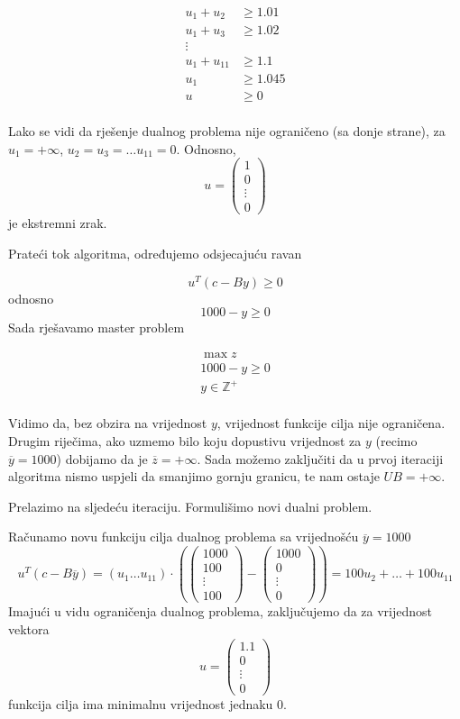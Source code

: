 \documentclass[a4paper, utf8, 11pt, colorlinks]{book}
\theoremstyle{definition}
\begin{document}
$$
\begin{aligned}
	u_1+u_2&\geqslant 1.01\\
	u_1+u_3&\geqslant 1.02\\
	\vdots&\\
	u_1+u_{11}&\geqslant 1.1\\
	u_1&\geqslant 1.045\\ 
	u&\geqslant 0\\
\end{aligned}
$$

Lako se vidi da rješenje dualnog problema nije ograničeno (sa donje strane), za $u_1 = +\infty$, $u_2 = u_3=\ldots u_{11}=0$.
Odnosno, 
$$u=\left(\begin{array}{c}
 1 \\
	0 \\
	\vdots \\
	0
\end{array}\right)$$ je ekstremni zrak.

Prateći tok algoritma, određujemo odsjecajuću ravan

$$u^{T}(c-By)\geqslant 0$$
odnosno
$$1000-y\geqslant 0$$
Sada rješavamo master problem

$$
\begin{aligned}
	\max z\\
	1000-y\geqslant 0\\
	y\in\mathbb{Z}^+\\	
	\end{aligned}
$$

Vidimo da, bez obzira na vrijednost $y$, vrijednost funkcije cilja nije ograničena.
Drugim riječima, ako uzmemo bilo koju dopustivu vrijednost za $y$ (recimo $\overline{y}=1000$) dobijamo da je $\overline{z} = +\infty$. Sada možemo zaključiti da u prvoj iteraciji algoritma nismo uspjeli da smanjimo gornju granicu, te nam ostaje $UB = +\infty$.

 Prelazimo na sljedeću iteraciju. Formulišimo novi dualni problem.
 
  Računamo novu funkciju cilja dualnog problema sa vrijednošću $\overline{y}=1000$
 $$
 u^T (c-B\overline{y})=(u_1\ldots u_{11})\cdot \left(\left(\begin{array}{c}
 	1000 \\
 	100 \\
 	\vdots \\
 	100
 \end{array}\right)-\left(\begin{array}{c}
 	1000 \\
 	0 \\
 	\vdots \\
 	0
 \end{array}\right)\right) = 100u_2+\ldots+100u_{11}
 $$
 Imajući u vidu ograničenja dualnog problema, zaključujemo da za vrijednost vektora $$u=\left(\begin{array}{c}
 	1.1 \\
 	0 \\
 	\vdots \\
 	0
 \end{array}\right)$$
funkcija cilja ima minimalnu vrijednost jednaku 0.
\end{document}
